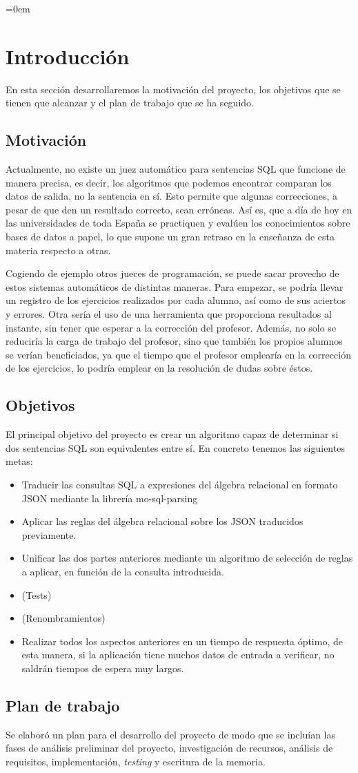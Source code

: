 \parindent=0em
\chapter{Introducción}
\noindent

En esta sección desarrollaremos la motivación del proyecto, los objetivos que se tienen que alcanzar y el plan de trabajo que se ha seguido.

\section{Motivación}
Actualmente, no existe un juez automático para sentencias SQL que funcione de manera precisa, es decir, los algoritmos que podemos encontrar comparan los datos de salida, no la sentencia en sí. Esto permite que algunas correcciones, a pesar de que den un resultado correcto, sean erróneas. Así es, que a día de hoy en las universidades de toda España se practiquen y evalúen los conocimientos sobre bases de datos a papel, lo que supone un gran retraso en la enseñanza de esta materia respecto a otras.

Cogiendo de ejemplo otros jueces de programación, se puede sacar provecho de estos sistemas automáticos de distintas maneras. Para empezar, se podría llevar un registro de los ejercicios realizados por cada alumno, así como de sus aciertos y errores. Otra sería el uso de una herramienta que proporciona resultados al instante, sin tener que esperar a la corrección del profesor. Además, no solo se reduciría la carga de trabajo del profesor, sino que también los propios alumnos se verían beneficiados, ya que el tiempo que el profesor emplearía en la corrección de los ejercicios, lo podría emplear en la resolución de dudas sobre éstos.

\section{Objetivos}
El principal objetivo del proyecto es crear un algoritmo capaz de determinar si dos sentencias SQL son equivalentes entre sí. En concreto tenemos las siguientes metas: 
\begin{itemize}
    \item Traducir las consultas SQL a expresiones del álgebra relacional en formato JSON mediante la librería mo-sql-parsing
    \item Aplicar las reglas del álgebra relacional sobre los JSON traducidos previamente.
    \item Unificar las dos partes anteriores mediante un algoritmo de selección de reglas a aplicar, en función de la consulta introducida.
    \item (Tests)
    \item (Renombramientos)
    \item Realizar todos los aspectos anteriores en un tiempo de respuesta óptimo, de esta manera, si la aplicación tiene muchos datos de entrada a verificar, no saldrán tiempos de espera muy largos.

\end{itemize}

\section{Plan de trabajo}
Se elaboró un plan para el desarrollo del proyecto de modo que se incluían las fases de análisis preliminar del proyecto, investigación de recursos, análisis de requisitos, implementación, \textit{testing} y escritura de la memoria.
